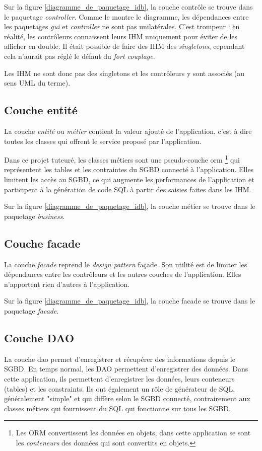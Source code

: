 Sur la figure \ref{diagramme_de_paquetage_idb}, la couche contrôle se trouve dans le paquetage \textit{controller}.
Comme le montre le diagramme, les dépendances entre les paquetages \textit{gui} et \textit{controller} ne sont pas unilatérales.
C'est trompeur : en réalité, les contrôleurs connaissent leurs IHM uniquement pour éviter de les afficher en double.
Il était possible de faire des IHM des \textit{singletons}, cependant cela n'aurait pas réglé le défaut du \textit{fort couplage}.

Les IHM ne sont donc pas des singletons et les contrôleurs y sont associés (au sens UML du terme).

\subsection{Couche entité}
La couche \textit{entité} ou \textit{métier} contient la valeur ajouté de l'application, c'est à dire toutes les classes qui offrent le service proposé par l'application.

Dans ce projet tuteuré, les classes métiers sont une pseudo-couche \gls{orm}
\footnote{\label{faux_orm}Les ORM convertissent les données en objets, dans cette application se sont les \textit{conteneurs} des données qui sont convertits en objets.}
qui représentent les tables et les contraintes du SGBD connecté à l'application.
Elles limitent les accès au SGBD, ce qui augmente les performances de l'application et participent à la génération de code SQL à partir des saisies faites dans les IHM.

Sur la figure \ref{diagramme_de_paquetage_idb}, la couche métier se trouve dans le paquetage \textit{business}.

\subsection{Couche facade}
La couche \textit{facade} reprend le \textit{design pattern} façade.
Son utilité est de limiter les dépendances entre les contrôleurs et les autres couches de l'application. Elles n'apportent rien d'autres à l'application.

Sur la figure \ref{diagramme_de_paquetage_idb}, la couche facade se trouve dans le paquetage \textit{facade}.

\subsection{Couche DAO}
La couche \gls{dao} permet d'enregistrer et récupérer des informations depuis le SGBD.
En temps normal, les DAO permettent d'enregistrer des données.
Dans cette application, ils permettent d'enregistrer les données, leurs conteneurs (tables) et les \glspl{constraint}.
Ils ont également un rôle de générateur de SQL, généralement "simple" et qui diffère selon le SGBD connecté, contrairement aux classes métiers qui fournissent du SQL qui fonctionne sur tous les SGBD.

